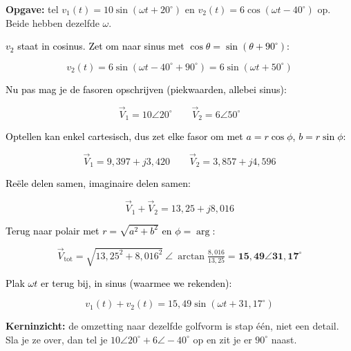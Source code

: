 \documentclass[a4paper,11pt]{article}
\newcommand{\stapreden}[1]{\par\vspace{1.4mm}\noindent\textcolor{black}{#1}\par\vspace{-2mm}}
\begin{document}
\begin{oefening}
    \textbf{Opgave:} tel $v_1(t) = 10\sin(\omega t + 20^\circ)$ en $v_2(t) = 6\cos(\omega t - 40^\circ)$
    op. Beide hebben dezelfde $\omega$.

    \stapreden{$v_2$ staat in cosinus. Zet om naar sinus met $\cos\theta = \sin(\theta + 90^\circ)$:}
    \[v_2(t) = 6\sin(\omega t - 40^\circ + 90^\circ) = 6\sin(\omega t + 50^\circ)\]

    \stapreden{Nu pas mag je de fasoren opschrijven (piekwaarden, allebei sinus):}
    \[\vec{V}_1 = 10\angle 20^\circ \qquad \vec{V}_2 = 6\angle 50^\circ\]

    \stapreden{Optellen kan enkel cartesisch, dus zet elke fasor om met $a = r\cos\phi$, $b = r\sin\phi$:}
    \[\vec{V}_1 = 9{,}397 + j3{,}420 \qquad \vec{V}_2 = 3{,}857 + j4{,}596\]

    \stapreden{Re\"ele delen samen, imaginaire delen samen:}
    \[\vec{V}_1 + \vec{V}_2 = 13{,}25 + j8{,}016\]

    \stapreden{Terug naar polair met $r = \sqrt{a^2+b^2}$ en $\phi = \arg$:}
    \[\vec{V}_{\text{tot}} = \sqrt{13{,}25^2 + 8{,}016^2}\ \angle\ \arctan\tfrac{8{,}016}{13{,}25}
        = \mathbf{15{,}49\angle 31{,}17^\circ}\]

    \stapreden{Plak $\omega t$ er terug bij, in sinus (waarmee we rekenden):}
    \[v_1(t) + v_2(t) = 15{,}49\sin(\omega t + 31{,}17^\circ)\]

    \textbf{Kerninzicht:} de omzetting naar dezelfde golfvorm is stap \'e\'en, niet een detail.
    Sla je ze over, dan tel je $10\angle 20^\circ + 6\angle -40^\circ$ op en zit je er $90^\circ$ naast.
\end{oefening}
\end{document}
